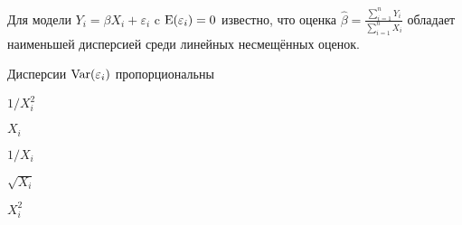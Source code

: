 
\begin{question}
Для модели \(Y_i = \beta X_i + \varepsilon_i\) c
\(\operatorname{E}(\varepsilon_i) = 0\) известно, что оценка
\(\hat \beta = \frac{\sum_{i=1}^n Y_i}{\sum_{i=1}^n X_i}\) обладает
наименьшей дисперсией среди линейных несмещённых оценок.

Дисперсии \(\operatorname{Var}(\varepsilon_i)\) пропорциональны
\begin{answerlist}
  \item \(1/X_i^2\)
  \item \(X_i\)
  \item \(1/X_i\)
  \item \(\sqrt{X_i}\)
  \item \(X_i^2\)
\end{answerlist}
\end{question}


